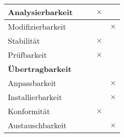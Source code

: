 \begin{table}[htbp]
\begin{tabular}{|l|p{2cm}|p{2cm}|p{2cm}|p{2cm}|}
		\quad Analysierbarkeit      &          &          & $\times$ &  \\ \hline
		\quad Modifizierbarkeit     &          &          &          & $\times$       \\ \hline
		\quad Stabilität            &          &          & \centering  $\times$ &  \\ \hline
		\quad Prüfbarkeit           &          &          & \centering $\times$ &  \\ \hline
		\multicolumn{5}{|l|}{\textbf{Übertragbarkeit}}                          \\ \hline
		\quad Anpassbarkeit         &          &          &          & $\times$       \\ \hline
		\quad Installierbarkeit     &          &          &          & $\times$       \\ \hline
		\quad Konformität           &          &          & $\times$ &  \\ \hline
		\quad Austauschbarkeit      &          &          &          & $\times$       \\ \hline
	\end{tabular}%
	\label{tab:QualAnfor}%
\end{table}%